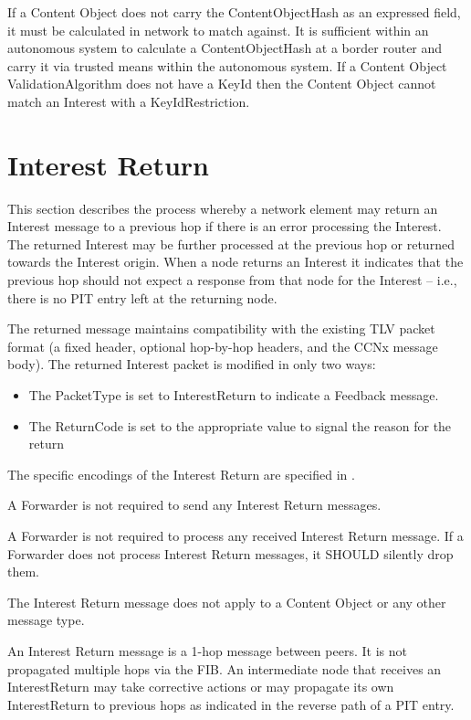 \documentclass[12pt]{article}
\begin{document}
If a Content Object does not carry the ContentObjectHash as an
expressed field, it must be calculated in network to match against.
It is sufficient within an autonomous system to calculate a
ContentObjectHash at a border router and carry it via trusted means
within the autonomous system.  If a Content Object
ValidationAlgorithm does not have a KeyId then the Content Object
cannot match an Interest with a KeyIdRestriction.

\section{Interest Return}
This section describes the process whereby a network element may
return an Interest message to a previous hop if there is an error
processing the Interest.  The returned Interest may be further
processed at the previous hop or returned towards the Interest
origin.  When a node returns an Interest it indicates that the
previous hop should not expect a response from that node for the
Interest -- i.e., there is no PIT entry left at the returning node.

The returned message maintains compatibility with the existing TLV
packet format (a fixed header, optional hop-by-hop headers, and the
CCNx message body).  The returned Interest packet is modified in only
two ways:

\begin{itemize}
\item  The PacketType is set to InterestReturn to indicate a Feedback
   message.

\item  The ReturnCode is set to the appropriate value to signal the
   reason for the return
\end{itemize}

The specific encodings of the Interest Return are specified in \cite{messages}.

A Forwarder is not required to send any Interest Return messages.

A Forwarder is not required to process any received Interest Return
message.  If a Forwarder does not process Interest Return messages,
it SHOULD silently drop them.

The Interest Return message does not apply to a Content Object or any
other message type.

An Interest Return message is a 1-hop message between peers.  It is
not propagated multiple hops via the FIB.  An intermediate node that
receives an InterestReturn may take corrective actions or may
propagate its own InterestReturn to previous hops as indicated in the
reverse path of a PIT entry.
\end{document}
